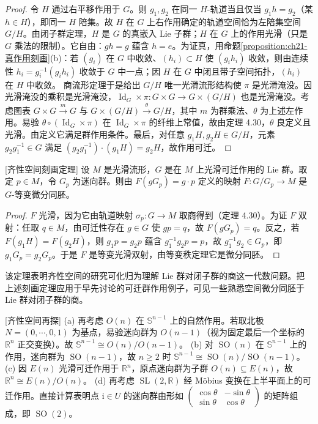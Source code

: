 \documentclass[../../main.tex]{subfiles}
\begin{document}
\begin{proof}
令 $H$ 通过右平移作用于 $G$。则 $g_1,g_2$ 在同一 $H$-轨道当且仅当 $g_1 h=g_2$（某 $h\in H$），即同一 $H$ 陪集。故 $H$ 在 $G$ 上右作用确定的轨道空间恰为左陪集空间 $G/H$。由闭子群定理，$H$ 是 $G$ 的真嵌入 Lie 子群；$H$ 在 $G$ 上的作用光滑（只是 $G$ 乘法的限制）。它自由：$gh=g$ 蕴含 $h=e$。为证真，用命题\cref{proposition:ch21-真作用刻画}(b)：若 $(g_i)$ 在 $G$ 中收敛、$(h_i)\subset H$ 使 $(g_i h_i)$ 收敛，则由连续性 $h_i=g_i^{-1}(g_i h_i)$ 收敛于 $G$ 中一点；因 $H$ 在 $G$ 中闭且带子空间拓扑，$(h_i)$ 在 $H$ 中收敛。
商流形定理于是给出 $G/H$ 唯一光滑流形结构使 $\pi$ 是光滑淹没。因光滑淹没的乘积是光滑淹没，$\operatorname{Id}_G\times\pi\colon G\times G\to G\times(G/H)$ 也是光滑淹没。考虑图表 $G\times G\xrightarrow{m}G$ 与 $G\times(G/H)\xrightarrow{\theta}G/H$，其中 $m$ 为群乘法、$\theta$ 为上述左作用。易验 $\theta\circ(\operatorname{Id}_G\times\pi)$ 在 $\operatorname{Id}_G\times\pi$ 的纤维上常值，故由定理 4.30，$\theta$ 良定义且光滑。由定义它满足群作用条件。最后，对任意 $g_1H,g_2H\in G/H$，元素 $g_2g_1^{-1}\in G$ 满足 $(g_2g_1^{-1})\cdot(g_1H)=g_2H$，故作用可迁。
\end{proof}

\begin{theorem}{[齐性空间刻画定理]}\label{theorem:ch21-齐性空间刻画}
设 $M$ 是光滑流形，$G$ 是在 $M$ 上光滑可迁作用的 Lie 群。取定 $p\in M$，令 $G_p$ 为迷向群。则由 $F(gG_p)=g\cdot p$ 定义的映射 $F\colon G/G_p\to M$ 是 $G$-等变微分同胚。
\end{theorem}

\begin{proof}
$F$ 光滑，因为它由轨道映射 $\sigma_p\colon G\to M$ 取商得到（定理 4.30）。为证 $F$ 双射：任取 $q\in M$，由可迁性存在 $g\in G$ 使 $gp=q$，故 $F(gG_p)=q$。反之，若 $F(g_1H)=F(g_2H)$，则 $g_1p=g_2p$ 蕴含 $g_1^{-1}g_2 p=p$，故 $g_1^{-1}g_2\in G_p$，即 $g_1G_p=g_2G_p$。于是 $F$ 是等变光滑双射，由等变秩定理它是微分同胚。
\end{proof}

该定理表明齐性空间的研究可化归为理解 Lie 群对闭子群的商这一代数问题。把上述刻画定理应用于早先讨论的可迁群作用例子，可见一些熟悉空间微分同胚于 Lie 群对闭子群的商。

\begin{example}{[齐性空间再探]}\label{example:ch21-齐性空间再探}
(a) 再考虑 $O(n)$ 在 $\mathbb{S}^{n-1}$ 上的自然作用。若取北极 $N=(0,\cdots ,0,1)$ 为基点，易验迷向群为 $O(n-1)$（视为固定最后一个坐标的 $\mathbb{R}^n$ 正交变换）。故 $\mathbb{S}^{n-1}\cong O(n)/O(n-1)$。
(b) 对 $\operatorname{SO}(n)$ 在 $\mathbb{S}^{n-1}$ 上的作用，迷向群为 $\operatorname{SO}(n-1)$，故 $n\geqslant2$ 时 $\mathbb{S}^{n-1}\cong\operatorname{SO}(n)/\operatorname{SO}(n-1)$。
(c) 因 $E(n)$ 光滑可迁作用于 $\mathbb{R}^n$，原点迷向群为子群 $O(n)\subseteq E(n)$，故 $\mathbb{R}^n\cong E(n)/O(n)$。
(d) 再考虑 $\operatorname{SL}(2,\mathbb{R})$ 经 Möbius 变换在上半平面上的可迁作用。直接计算表明点 $\mathrm{i}\in U$ 的迷向群由形如 $\begin{pmatrix}\cos\theta&-\sin\theta\\ \sin\theta&\cos\theta\end{pmatrix}$ 的矩阵组成，即 $\operatorname{SO}(2)$。
\end{example}
\end{document}
